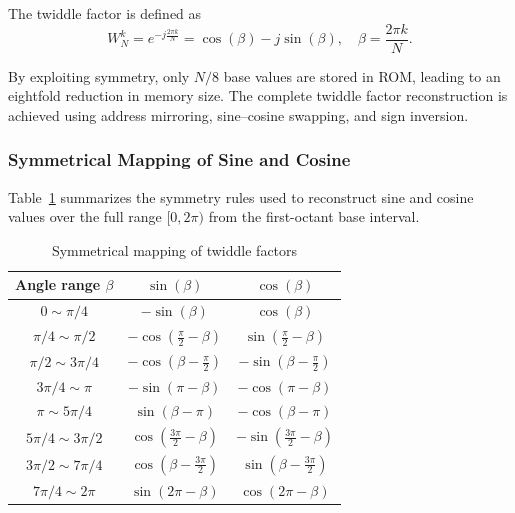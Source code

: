 The twiddle factor is defined as
\begin{equation}
W_N^k = e^{-j\frac{2\pi k}{N}} = \cos(\beta) - j\sin(\beta),
\quad \beta = \frac{2\pi k}{N}.
\end{equation}

By exploiting symmetry, only $N/8$ base values are stored in ROM, leading to an eightfold reduction in memory size.
The complete twiddle factor reconstruction is achieved using address mirroring, sine--cosine swapping, and sign inversion.

\subsubsection{Symmetrical Mapping of Sine and Cosine}

Table~\ref{tab:twiddle_mapping} summarizes the symmetry rules used to reconstruct sine and cosine values over the full range $[0,2\pi)$ from the first-octant base interval.

\begin{table}
\centering
\caption{Symmetrical mapping of twiddle factors}
\label{tab:twiddle_mapping}
\begin{tabular}{c|c|c}
\toprule
Angle range $\beta$ & $\sin(\beta)$ & $\cos(\beta)$ \\
\midrule
$0 \sim \pi/4$ &
$-\sin(\beta)$ &
$\cos(\beta)$ \\

$\pi/4 \sim \pi/2$ &
$-\cos(\tfrac{\pi}{2}-\beta)$ &
$\sin(\tfrac{\pi}{2}-\beta)$ \\

$\pi/2 \sim 3\pi/4$ &
$-\cos(\beta-\tfrac{\pi}{2})$ &
$-\sin(\beta-\tfrac{\pi}{2})$ \\

$3\pi/4 \sim \pi$ &
$-\sin(\pi-\beta)$ &
$-\cos(\pi-\beta)$ \\

$\pi \sim 5\pi/4$ &
$\sin(\beta-\pi)$ &
$-\cos(\beta-\pi)$ \\

$5\pi/4 \sim 3\pi/2$ &
$\cos(\tfrac{3\pi}{2}-\beta)$ &
$-\sin(\tfrac{3\pi}{2}-\beta)$ \\

$3\pi/2 \sim 7\pi/4$ &
$\cos(\beta-\tfrac{3\pi}{2})$ &
$\sin(\beta-\tfrac{3\pi}{2})$ \\

$7\pi/4 \sim 2\pi$ &
$\sin(2\pi-\beta)$ &
$\cos(2\pi-\beta)$ \\
\bottomrule
\end{tabular}
\end{table}

